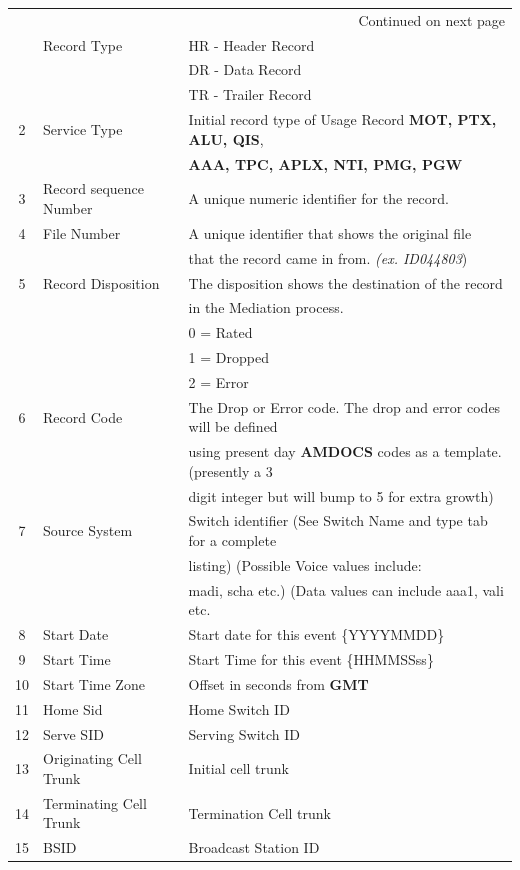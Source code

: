 \documentclass[12pt,twoside]{article}
\begin{document}
\begin{longtable}{c|l|l}
\hline
\endhead
\hline\multicolumn{3}{r}{Continued on next page} \\
\endfoot
\endlastfoot
\hline
1 & Record Type & HR - Header Record\\
&  & DR - Data Record\\
&  & TR - Trailer Record\\
2 & Service Type & Initial record type of Usage Record \textbf{MOT, PTX, ALU, QIS},\\
&  & \textbf{AAA, TPC, APLX, NTI, PMG, PGW}\\
3 & Record sequence Number & A unique numeric identifier for the record.\\
4 & File Number & A unique identifier that shows the original file\\
&  & that the record came in from. \emph{(ex. ID044803})\\
5 & Record Disposition & The disposition shows the destination of the record\\
&  & in the Mediation process.\\
&  & 0 = Rated\\
&  & 1 = Dropped\\
&  & 2 = Error\\
6 & Record Code & The Drop or Error code. The drop and error codes will be defined\\
&  & using present day \textbf{AMDOCS} codes as a template. (presently a 3\\
&  & digit integer but will bump to 5 for extra growth)\\
7 & Source System & Switch identifier (See Switch Name and type tab for a complete\\
&  & listing) (Possible Voice values include:\\
&  & madi, scha etc.) (Data values can include aaa1, vali etc.\\
8 & Start Date & Start date for this event \{YYYYMMDD\}\\
9 & Start Time & Start Time for this event \{HHMMSSss\}\\
10 & Start Time Zone & Offset in seconds from \textbf{GMT}\\
11 & Home Sid & Home Switch ID\\
12 & Serve SID & Serving Switch ID\\
13 & Originating Cell Trunk & Initial cell trunk\\
14 & Terminating Cell Trunk & Termination Cell trunk\\
15 & BSID & Broadcast Station ID\\

\end{longtable}
\end{document}
